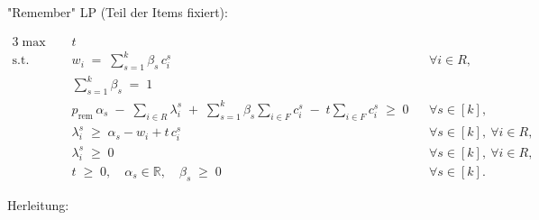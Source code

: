 \documentclass[abstracton]{scrartcl}
\begin{document}
"Remember" LP (Teil der Items fixiert):

\begin{alignat}{3}
	\label{lp:compact-remember}
	\max \quad & t \\[1mm]
	\text{s.t.}\quad
	& w_i \;=\; \sum_{s=1}^k \beta_s\, c_i^s
	&& \forall i\in R, \label{lp:remember-w}\\[1mm]
	& \sum_{s=1}^k \beta_s \;=\; 1
	&& \label{lp:remember-simplex}\\[2mm]
	& p_{\mathrm{rem}}\,\alpha_s \;-\; \sum_{i\in R} \lambda^s_i
	\;+\; \sum_{s=1}^k \beta_s \sum_{i\in F} c_i^s
	\;-\; t \sum_{i\in F} c_i^s \;\ge\; 0
	&& \forall s\in[k], \label{lp:remember-dual1}\\[1mm]
	& \lambda^s_i \;\ge\; \alpha_s - w_i + t\,c_i^s
	&& \forall s\in[k],\ \forall i\in R, \label{lp:remember-dual2}\\[1mm]
	& \lambda^s_i \;\ge\; 0
	&& \forall s\in[k],\ \forall i\in R, \label{lp:remember-dual3}\\[1mm]
	& t \;\ge\; 0,\quad \alpha_s \in \mathbb{R},\quad \beta_s \;\ge\; 0
	&& \forall s\in[k]. \label{lp:remember-sign}
\end{alignat}

Herleitung:
\end{document}
